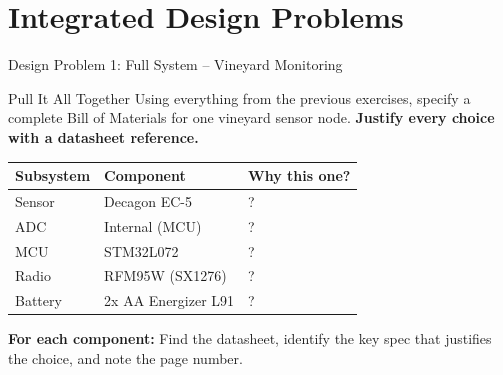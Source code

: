 \documentclass[aspectratio=169,11pt]{beamer}
\begin{document}
\section{Integrated Design Problems}

\begin{frame}{Design Problem 1: Full System -- Vineyard Monitoring}
    \begin{block}{Pull It All Together}
        Using everything from the previous exercises, specify a complete Bill of Materials for one vineyard sensor node. \textbf{Justify every choice with a datasheet reference.}
        
        \vspace{0.2cm}
        \begin{center}
        \begin{tabular}{lll}
            \toprule
            \textbf{Subsystem} & \textbf{Component} & \textbf{Why this one?} \\
            \midrule
            Sensor & Decagon EC-5 & ? \\
            ADC & Internal (MCU) & ? \\
            MCU & STM32L072 & ? \\
            Radio & RFM95W (SX1276) & ? \\
            Battery & 2x AA Energizer L91 & ? \\
            \bottomrule
        \end{tabular}
        \end{center}
        
        \vspace{0.2cm}
        \textbf{For each component:} Find the datasheet, identify the key spec that justifies the choice, and note the page number.
    \end{block}
\end{frame}
\end{document}
